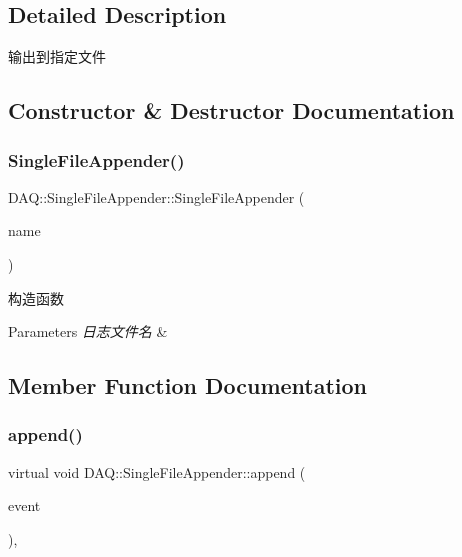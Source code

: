 \subsection{Detailed Description}
输出到指定文件 

\subsection{Constructor \& Destructor Documentation}
\mbox{\label{classDAQ_1_1SingleFileAppender_ab33bab53a0f1fc7a4c8ab8d3aba1282e}} 
\subsubsection{\texorpdfstring{Single\+File\+Appender()}{SingleFileAppender()}}
{\footnotesize\ttfamily D\+A\+Q\+::\+Single\+File\+Appender\+::\+Single\+File\+Appender (\begin{DoxyParamCaption}\item[{const std\+::string \&}]{name }\end{DoxyParamCaption})}



构造函数 


\begin{DoxyParams}{Parameters}
{\em 日志文件名} & \\
\hline
\end{DoxyParams}


\subsection{Member Function Documentation}
\mbox{\label{classDAQ_1_1SingleFileAppender_ae006b18883d7b57302ef8335e095a0e3}} 
\subsubsection{\texorpdfstring{append()}{append()}}
{\footnotesize\ttfamily virtual void D\+A\+Q\+::\+Single\+File\+Appender\+::append (\begin{DoxyParamCaption}\item[{Log\+Event\+::sptr}]{event }\end{DoxyParamCaption})\hspace{0.3cm}{\ttfamily [override]}, {\ttfamily [virtual]}}



